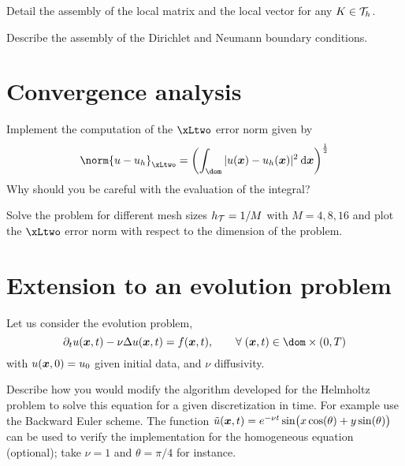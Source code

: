 \documentclass[assignment]{tmanotes}
\begin{document}
\medskip
\begin{tmatsks}
\item Detail the assembly of the local matrix and the local vector for any $K\in{\mathcal T}_h$.
\item Describe the assembly of the Dirichlet and Neumann boundary conditions.
\end{tmatsks}

\section{Convergence analysis}

\medskip
\begin{tmatsks}
\item Implement the computation of the $\xLtwo$ error norm given by
\[
\norm{u - u_h}_{\xLtwo} = \left(\int_{\dom} |u(\xx) - u_h(\xx)|^2 \md\xx\right)^\frac{1}{2}
\]
Why should you be careful with the evaluation of the integral?
\item Solve the problem for different mesh sizes $h_{\mathcal T} = 1/M$ with $M = 4,8,16$ and plot the $\xLtwo$ error norm with respect to the dimension of the problem.
\end{tmatsks}

\section{Extension to an evolution problem}

Let us consider the evolution problem,
\begin{equation}\label{eq:heat_equation}
\partial_t u(\xx,t) - \nu\Delta u(\xx,t) = f(\xx,t), \qquad \forany (\xx,t)\in\dom\times(0,T)
\end{equation}
with $u({{\boldsymbol x}}, 0) = u_0$ given initial data, and $\nu$ diffusivity.


\medskip
\begin{tmatsks}
\item Describe how you would modify the algorithm developed for the Helmholtz problem to solve this equation for a given discretization in time. For example use the Backward Euler scheme. The function $\tilde u({{\boldsymbol x}},t) = e^{-\nu t} \sin\bigl(x \cos(\theta) + y\sin(\theta)\bigr)$ can be used to verify the implementation for the homogeneous equation (optional); take $\nu = 1$ and $\theta = \pi/4$ for instance.
\end{tmatsks}



\end{document}
